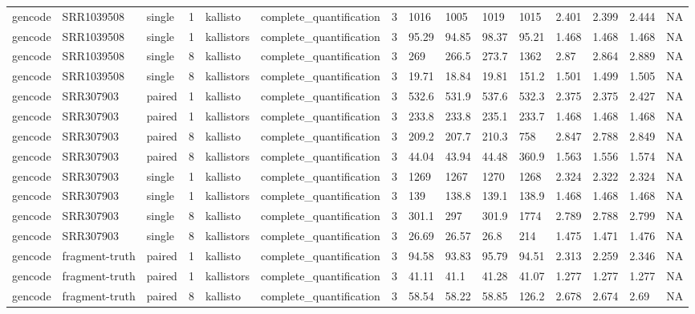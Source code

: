 \begin{tabular}{lllllllllllllll}
gencode & SRR1039508 & single & 1 & kallisto & complete\_quantification & 3 & 1016 & 1005 & 1019 & 1015 & 2.401 & 2.399 & 2.444 & NA \\
gencode & SRR1039508 & single & 1 & kallistors & complete\_quantification & 3 & 95.29 & 94.85 & 98.37 & 95.21 & 1.468 & 1.468 & 1.468 & NA \\
gencode & SRR1039508 & single & 8 & kallisto & complete\_quantification & 3 & 269 & 266.5 & 273.7 & 1362 & 2.87 & 2.864 & 2.889 & NA \\
gencode & SRR1039508 & single & 8 & kallistors & complete\_quantification & 3 & 19.71 & 18.84 & 19.81 & 151.2 & 1.501 & 1.499 & 1.505 & NA \\
gencode & SRR307903 & paired & 1 & kallisto & complete\_quantification & 3 & 532.6 & 531.9 & 537.6 & 532.3 & 2.375 & 2.375 & 2.427 & NA \\
gencode & SRR307903 & paired & 1 & kallistors & complete\_quantification & 3 & 233.8 & 233.8 & 235.1 & 233.7 & 1.468 & 1.468 & 1.468 & NA \\
gencode & SRR307903 & paired & 8 & kallisto & complete\_quantification & 3 & 209.2 & 207.7 & 210.3 & 758 & 2.847 & 2.788 & 2.849 & NA \\
gencode & SRR307903 & paired & 8 & kallistors & complete\_quantification & 3 & 44.04 & 43.94 & 44.48 & 360.9 & 1.563 & 1.556 & 1.574 & NA \\
gencode & SRR307903 & single & 1 & kallisto & complete\_quantification & 3 & 1269 & 1267 & 1270 & 1268 & 2.324 & 2.322 & 2.324 & NA \\
gencode & SRR307903 & single & 1 & kallistors & complete\_quantification & 3 & 139 & 138.8 & 139.1 & 138.9 & 1.468 & 1.468 & 1.468 & NA \\
gencode & SRR307903 & single & 8 & kallisto & complete\_quantification & 3 & 301.1 & 297 & 301.9 & 1774 & 2.789 & 2.788 & 2.799 & NA \\
gencode & SRR307903 & single & 8 & kallistors & complete\_quantification & 3 & 26.69 & 26.57 & 26.8 & 214 & 1.475 & 1.471 & 1.476 & NA \\
gencode & fragment-truth & paired & 1 & kallisto & complete\_quantification & 3 & 94.58 & 93.83 & 95.79 & 94.51 & 2.313 & 2.259 & 2.346 & NA \\
gencode & fragment-truth & paired & 1 & kallistors & complete\_quantification & 3 & 41.11 & 41.1 & 41.28 & 41.07 & 1.277 & 1.277 & 1.277 & NA \\
gencode & fragment-truth & paired & 8 & kallisto & complete\_quantification & 3 & 58.54 & 58.22 & 58.85 & 126.2 & 2.678 & 2.674 & 2.69 & NA \\

\end{tabular}
